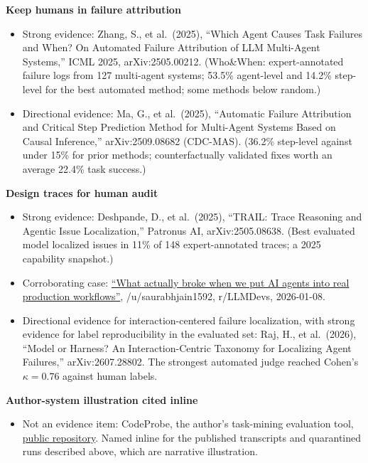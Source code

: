 \textbf{Keep humans in failure attribution}

\begin{itemize}
\tightlist
\item
  Strong evidence: Zhang, S., et al.~(2025), ``Which Agent Causes Task Failures and When? On Automated Failure Attribution of LLM Multi-Agent Systems,'' ICML 2025, arXiv:2505.00212. (Who\&When: expert-annotated failure logs from 127 multi-agent systems; 53.5\% agent-level and 14.2\% step-level for the best automated method; some methods below random.)
\item
  Directional evidence: Ma, G., et al.~(2025), ``Automatic Failure Attribution and Critical Step Prediction Method for Multi-Agent Systems Based on Causal Inference,'' arXiv:2509.08682 (CDC-MAS). (36.2\% step-level against under 15\% for prior methods; counterfactually validated fixes worth an average 22.4\% task success.)
\end{itemize}

\textbf{Design traces for human audit}

\begin{itemize}
\tightlist
\item
  Strong evidence: Deshpande, D., et al.~(2025), ``TRAIL: Trace Reasoning and Agentic Issue Localization,'' Patronus AI, arXiv:2505.08638. (Best evaluated model localized issues in 11\% of 148 expert-annotated traces; a 2025 capability snapshot.)
\item
  Corroborating case: \href{https://www.reddit.com/r/LLMDevs/comments/1q7avil/}{``What actually broke when we put AI agents into real production workflows''}, /u/saurabhjain1592, r/LLMDevs, 2026-01-08.
\item
  Directional evidence for interaction-centered failure localization, with strong evidence for label reproducibility in the evaluated set: Raj, H., et al.~(2026), ``Model or Harness? An Interaction-Centric Taxonomy for Localizing Agent Failures,'' arXiv:2607.28802. The strongest automated judge reached Cohen's \(\kappa=0.76\) against human labels.
\end{itemize}

\textbf{Author-system illustration cited inline}

\begin{itemize}
\tightlist
\item
  Not an evidence item: CodeProbe, the author's task-mining evaluation tool, \href{https://github.com/sjarmak/codeprobe}{public repository}. Named inline for the published transcripts and quarantined runs described above, which are narrative illustration.
\end{itemize}
